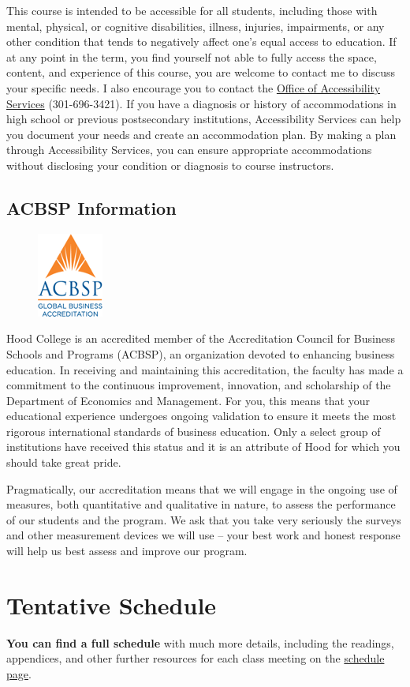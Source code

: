 \documentclass{article}
\begin{document}
This course is intended to be accessible for all students, including
those with mental, physical, or cognitive disabilities, illness,
injuries, impairments, or any other condition that tends to negatively
affect one's equal access to education. If at any point in the term, you
find yourself not able to fully access the space, content, and
experience of this course, you are welcome to contact me to discuss your
specific needs. I also encourage you to contact the
\href{https://www.hood.edu/academics/josephine-steiner-center-academic-achievement-retention/accessibility-services}{Office
of Accessibility Services} (301-696-3421). If you have a diagnosis or
history of accommodations in high school or previous postsecondary
institutions, Accessibility Services can help you document your needs
and create an accommodation plan. By making a plan through Accessibility
Services, you can ensure appropriate accommodations without disclosing
your condition or diagnosis to course instructors.

\hypertarget{acbsp-information}{%
\subsection{ACBSP Information}\label{acbsp-information}}

\begin{figure}[h!]
\centering
\includegraphics[]{../images/acbsp.png}
\end{figure}

Hood College is an accredited member of the Accreditation Council for
Business Schools and Programs (ACBSP), an organization devoted to
enhancing business education. In receiving and maintaining this
accreditation, the faculty has made a commitment to the continuous
improvement, innovation, and scholarship of the Department of Economics
and Management. For you, this means that your educational experience
undergoes ongoing validation to ensure it meets the most rigorous
international standards of business education. Only a select group of
institutions have received this status and it is an attribute of Hood
for which you should take great pride.

Pragmatically, our accreditation means that we will engage in the
ongoing use of measures, both quantitative and qualitative in nature, to
assess the performance of our students and the program. We ask that you
take very seriously the surveys and other measurement devices we will
use -- your best work and honest response will help us best assess and
improve our program.

\hypertarget{tentative-schedule}{%
\section{Tentative Schedule}\label{tentative-schedule}}

\textbf{You can find a full schedule} with much more details, including
the readings, appendices, and other further resources for each class
meeting on the \href{schedule/}{schedule page}.
\end{document}
